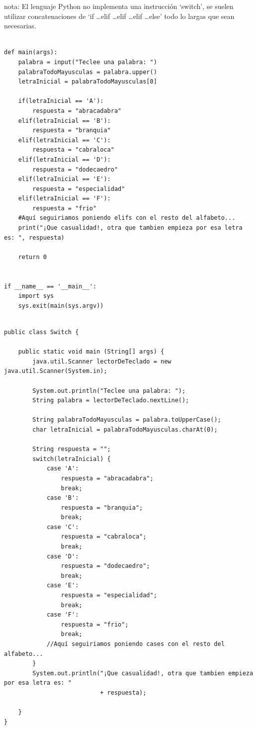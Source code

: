 \documentclass[spanish,12pt,a4paper,final,oneside]{book}
\begin{document}
nota: El lenguaje Python no implementa una instrucción `switch', se suelen utilizar concatenaciones de `if \ldots elif \ldots elif \ldots elif \ldots else' todo lo largas que sean necesarias.
\begin{lstlisting}[frame=single, caption=lenguaje python]

def main(args):
    palabra = input("Teclee una palabra: ")
    palabraTodoMayusculas = palabra.upper()
    letraInicial = palabraTodoMayusculas[0]
    
    if(letraInicial == 'A'):
        respuesta = "abracadabra"
    elif(letraInicial == 'B'):
        respuesta = "branquia"
    elif(letraInicial == 'C'):
        respuesta = "cabraloca"
    elif(letraInicial == 'D'):
        respuesta = "dodecaedro"
    elif(letraInicial == 'E'):
        respuesta = "especialidad"
    elif(letraInicial == 'F'):
        respuesta = "frio"
    #Aquí seguiriamos poniendo elifs con el resto del alfabeto...
    print("¡Que casualidad!, otra que tambien empieza por esa letra es: ", respuesta)

    return 0


if __name__ == '__main__':
    import sys
    sys.exit(main(sys.argv))
\end{lstlisting}


\begin{lstlisting}[frame=single, caption=lenguaje java]

public class Switch {
	
    public static void main (String[] args) {
        java.util.Scanner lectorDeTeclado = new java.util.Scanner(System.in);
        
        System.out.println("Teclee una palabra: ");
        String palabra = lectorDeTeclado.nextLine();
        
        String palabraTodoMayusculas = palabra.toUpperCase();
        char letraInicial = palabraTodoMayusculas.charAt(0);
        
        String respuesta = "";
        switch(letraInicial) {
            case 'A':
                respuesta = "abracadabra";
                break;
            case 'B':
                respuesta = "branquia";
                break;
            case 'C':
                respuesta = "cabraloca";
                break;
            case 'D':
                respuesta = "dodecaedro";
                break;
            case 'E':
                respuesta = "especialidad";
                break;
            case 'F':
                respuesta = "frio";
                break;
            //Aquí seguiriamos poniendo cases con el resto del alfabeto...
        }
        System.out.println("¡Que casualidad!, otra que tambien empieza por esa letra es: "
                           + respuesta);
		
    }
}


\end{lstlisting}
\end{document}
